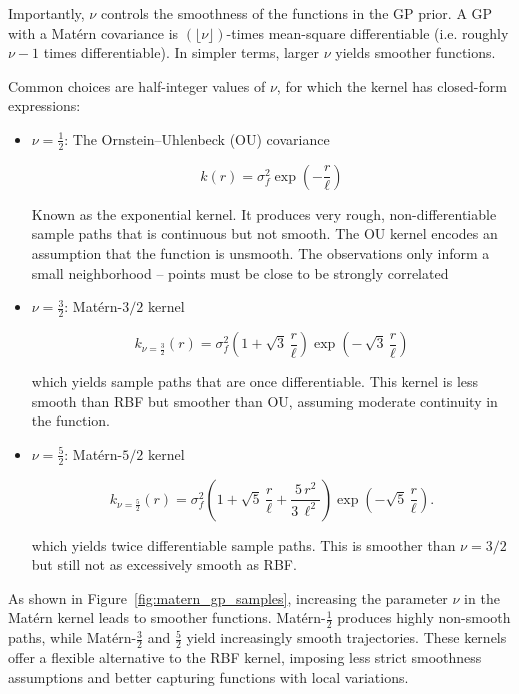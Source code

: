 \documentclass{ut-thesis}
\begin{document}
Importantly, $\nu$ controls the smoothness of the functions in the GP prior. A GP with a Matérn covariance is $(\lfloor \nu \rfloor)$-times mean-square differentiable (i.e. roughly $\nu - 1$ times differentiable). In simpler terms, larger $\nu$ yields smoother functions. 

Common choices are half-integer values of $\nu$, for which the kernel has closed-form expressions:

\begin{itemize}
    \item $\nu = \frac{1}{2}$: The Ornstein–Uhlenbeck (OU) covariance
    
    \begin{equation}
    k(r) = \sigma_f^2 \exp( -\frac{r}{\ell})
    \end{equation}

    Known as the exponential kernel. It produces very rough, non-differentiable sample paths that is continuous but not smooth. The OU kernel encodes an assumption that the function is unsmooth. The observations only inform a small neighborhood – points must be close to be strongly correlated

    \item $\nu = \frac{3}{2}$: Matérn-$3/2$ kernel

    \begin{equation}
        k_{\nu=\frac{3}{2}}(r) = \sigma_f^2 
        \left(1 + \sqrt{3}\,\frac{r}{\ell}\right)\exp\!\left(-\,\sqrt{3}\,\frac{r}{\ell}\right)
    \end{equation}

    which yields sample paths that are once differentiable. This kernel is less smooth than RBF but smoother than OU, assuming moderate continuity in the function.

    \item $\nu = \frac{5}{2}$: Matérn-$5/2$ kernel

    \begin{equation}
        k_{\nu=\frac{5}{2}}(r) = \sigma_f^2 \left(1 + \sqrt{5}\,\frac{r}{\ell}+ \frac{5\,r^2}{3\,\ell^2}\right)\exp\!\left(-\sqrt{5}\,\frac{r}{\ell}\right).
    \end{equation}

    which yields twice differentiable sample paths. This is smoother than $\nu=3/2$ but still not as excessively smooth as RBF.
\end{itemize}

As shown in Figure~\ref{fig:matern_gp_samples}, increasing the parameter \( \nu \) in the Matérn kernel leads to smoother functions. Matérn-\( \frac{1}{2} \) produces highly non-smooth paths, while Matérn-\( \frac{3}{2} \) and \( \frac{5}{2} \) yield increasingly smooth trajectories. These kernels offer a flexible alternative to the RBF kernel, imposing less strict smoothness assumptions and better capturing functions with local variations.
\end{document}
